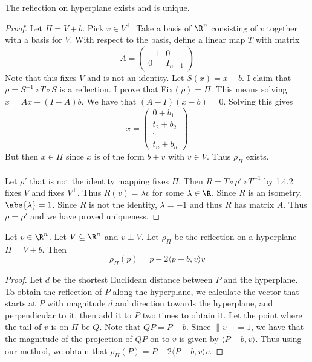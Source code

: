 \documentclass[a4paper]{article}
\begin{document}
\begin{prp}{}{} The reflection on hyperplane exists and is unique. \tcbline
\begin{proof} Let $\Pi=V+b$. Pick $v\in V^\perp$. Take a basis of $\R^n$ consisting of $v$ together with a basis for $V$. With respect to the basis, define a linear map $T$ with matrix $$A=\begin{pmatrix}
-1 & 0\\
0 & I_{n-1}
\end{pmatrix}$$
Note that this fixes $V$ and is not an identity. Let $S(x)=x-b$. I claim that $\rho=S^{-1}\circ T\circ S$ is  a reflection. I prove that Fix$(\rho)=\Pi$. This means solving $x=Ax+(I-A)b$. We have that $(A-I)(x-b)=0$. Solving this gives $$x=\begin{pmatrix}
0+b_1\\
t_2+b_2\\
\ddots\\
t_n+b_n
\end{pmatrix}$$
But then $x\in\Pi$ since $x$ is of the form $b+v$ with $v\in V$. Thus $\rho_\Pi$ exists. \\~\\
Let $\rho'$ that is not the identity mapping fixes $\Pi$. Then $R=T\circ\rho'\circ T^{-1}$ by 1.4.2 fixes $V$ and fixes $V^\perp$. Thus $R(v)=\lambda v$ for some $\lambda\in\R$. Since $R$ is an isometry, $\abs{\lambda}=1$. Since $R$ is not the identity, $\lambda=-1$ and thus $R$ has matrix $A$. Thus $\rho=\rho'$ and we have proved uniqueness. 
\end{proof}
\end{prp}

\begin{lmm}{}{} Let $p\in\R^n$. Let $V\subseteq\R^n$ and $v\perp V$. Let $\rho_\Pi$ be the reflection on a hyperplane $\Pi=V+b$. Then $$\rho_\Pi(p)=p-2\langle p-b, v\rangle v$$\tcbline
\begin{proof}
Let $d$ be the shortest Euclidean distance between $P$ and the hyperplane. To obtain the reflection of $P$ along the hyperplane, we calculate the vector that starts at $P$ with magnitude $d$ and direction towards the hyperplane, and perpendicular to it, then add it to $P$ two times to obtain it. \linebreak\linebreak
Let the point where the tail of $v$ is on $\Pi$ be $Q$. Note that $QP=P-b$. Since $\|v\|=1$, we have that the magnitude of the projection of $QP$ on to $v$ is given by $\langle P-b,v\rangle$. Thus using our method, we obtain that $\rho_\Pi(P)=P-2\langle P-b,v\rangle v$. 
\end{proof}
\end{lmm}
\end{document}
